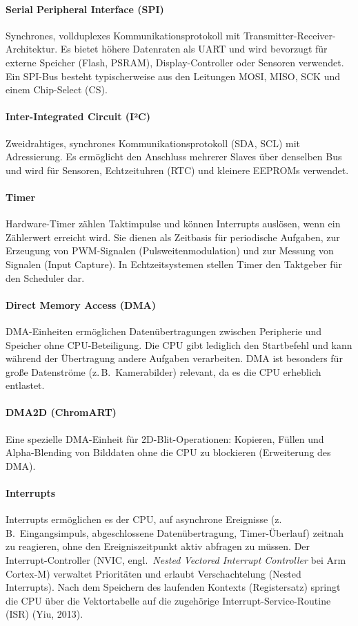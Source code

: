 \paragraph{Serial Peripheral Interface (SPI)}
Synchrones, vollduplexes Kommunikationsprotokoll mit Transmitter-Receiver-Architektur. Es bietet höhere Datenraten als UART und wird bevorzugt für externe Speicher (Flash, PSRAM), Display-Controller oder Sensoren verwendet. Ein SPI-Bus besteht typischerweise aus den Leitungen MOSI, MISO, SCK und einem Chip-Select (CS).
\paragraph{Inter-Integrated Circuit (I²C)}
Zweidrahtiges, synchrones Kommunikationsprotokoll (SDA, SCL) mit Adressierung. Es ermöglicht den Anschluss mehrerer Slaves über denselben Bus und wird für Sensoren, Echtzeituhren (RTC) und kleinere EEPROMs verwendet.
\paragraph{Timer}
Hardware-Timer zählen Taktimpulse und können Interrupts auslösen, wenn ein Zählerwert erreicht wird. Sie dienen als Zeitbasis für periodische Aufgaben, zur Erzeugung von PWM-Signalen (Pulsweitenmodulation) und zur Messung von Signalen (Input Capture). In Echtzeitsystemen stellen Timer den Taktgeber für den Scheduler dar.
\paragraph{Direct Memory Access (DMA)}
DMA-Einheiten ermöglichen Datenübertragungen zwischen Peripherie und Speicher ohne CPU-Beteiligung. Die CPU gibt lediglich den Startbefehl und kann während der Übertragung andere Aufgaben verarbeiten. DMA ist besonders für große Datenströme (z.\,B.\ Kamerabilder) relevant, da es die CPU erheblich entlastet.
\paragraph{DMA2D (ChromART)}
Eine spezielle DMA-Einheit für 2D-Blit-Operationen: Kopieren, Füllen und Alpha-Blending von Bilddaten ohne die CPU zu blockieren (Erweiterung des DMA).
\paragraph{Interrupts}
Interrupts ermöglichen es der CPU, auf asynchrone Ereignisse (z.\,B.\ Eingangsimpuls, abgeschlossene Datenübertragung, Timer-Überlauf) zeitnah zu reagieren, ohne den Ereigniszeitpunkt aktiv abfragen zu müssen. Der Interrupt-Controller (NVIC, engl.\ \textit{Nested Vectored Interrupt Controller} bei Arm Cortex-M) verwaltet Prioritäten und erlaubt Verschachtelung (Nested Interrupts). Nach dem Speichern des laufenden Kontexts (Registersatz) springt die CPU über die Vektortabelle auf die zugehörige Interrupt-Service-Routine (ISR) (Yiu, 2013).


